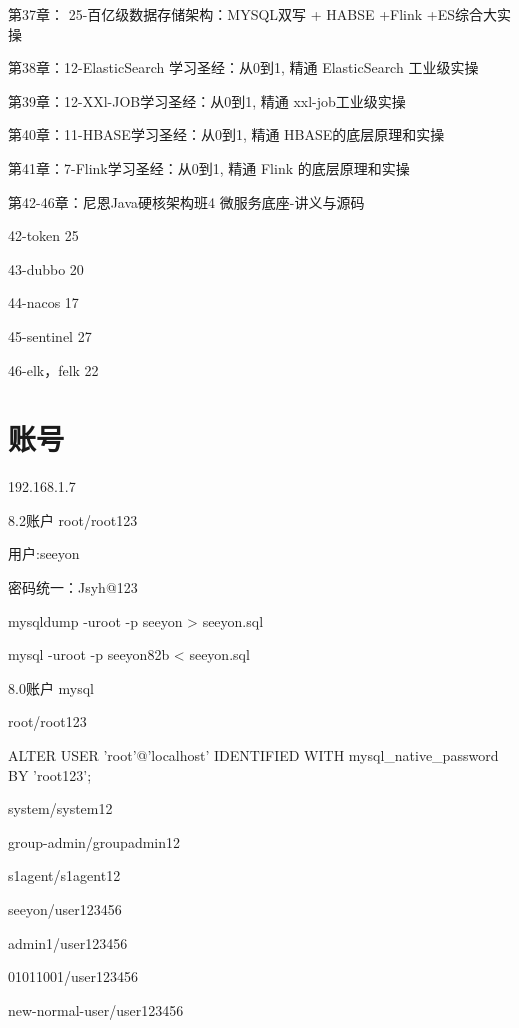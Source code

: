 \documentclass[10pt]{article}
\begin{document}
第37章： 25-百亿级数据存储架构：MYSQL双写 + HABSE +Flink +ES综合大实操

第38章：12-ElasticSearch 学习圣经：从0到1, 精通  ElasticSearch 工业级实操

第39章：12-XXl-JOB学习圣经：从0到1, 精通  xxl-job工业级实操

第40章：11-HBASE学习圣经：从0到1, 精通  HBASE的底层原理和实操

第41章：7-Flink学习圣经：从0到1, 精通 Flink 的底层原理和实操

第42-46章：尼恩Java硬核架构班4 微服务底座-讲义与源码

42-token      25

43-dubbo     20

44-nacos      17

45-sentinel  27
    
46-elk，felk 22


\newpage

\section{账号}

192.168.1.7

8.2账户
root/root123

用户:seeyon

密码统一：Jsyh@123

mysqldump -uroot -p seeyon > seeyon.sql

mysql -uroot -p seeyon82b < seeyon.sql


8.0账户
mysql

root/root123

ALTER USER 'root'@'localhost' IDENTIFIED WITH mysql\_native\_password BY 'root123';

system/system12

group-admin/groupadmin12

s1agent/s1agent12

seeyon/user123456

admin1/user123456

01011001/user123456

new-normal-user/user123456

\newpage
\end{document}

